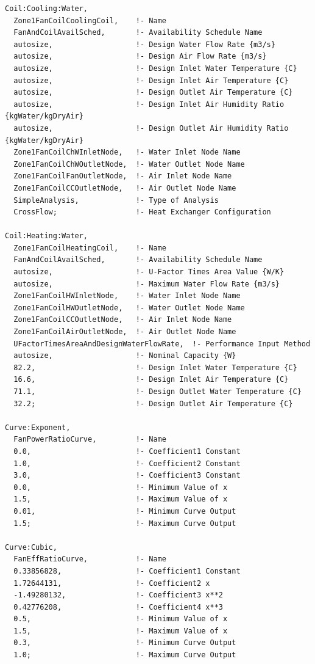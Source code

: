 \begin{lstlisting}
Coil:Cooling:Water,
  Zone1FanCoilCoolingCoil,    !- Name
  FanAndCoilAvailSched,       !- Availability Schedule Name
  autosize,                   !- Design Water Flow Rate {m3/s}
  autosize,                   !- Design Air Flow Rate {m3/s}
  autosize,                   !- Design Inlet Water Temperature {C}
  autosize,                   !- Design Inlet Air Temperature {C}
  autosize,                   !- Design Outlet Air Temperature {C}
  autosize,                   !- Design Inlet Air Humidity Ratio {kgWater/kgDryAir}
  autosize,                   !- Design Outlet Air Humidity Ratio {kgWater/kgDryAir}
  Zone1FanCoilChWInletNode,   !- Water Inlet Node Name
  Zone1FanCoilChWOutletNode,  !- Water Outlet Node Name
  Zone1FanCoilFanOutletNode,  !- Air Inlet Node Name
  Zone1FanCoilCCOutletNode,   !- Air Outlet Node Name
  SimpleAnalysis,             !- Type of Analysis
  CrossFlow;                  !- Heat Exchanger Configuration

Coil:Heating:Water,
  Zone1FanCoilHeatingCoil,    !- Name
  FanAndCoilAvailSched,       !- Availability Schedule Name
  autosize,                   !- U-Factor Times Area Value {W/K}
  autosize,                   !- Maximum Water Flow Rate {m3/s}
  Zone1FanCoilHWInletNode,    !- Water Inlet Node Name
  Zone1FanCoilHWOutletNode,   !- Water Outlet Node Name
  Zone1FanCoilCCOutletNode,   !- Air Inlet Node Name
  Zone1FanCoilAirOutletNode,  !- Air Outlet Node Name
  UFactorTimesAreaAndDesignWaterFlowRate,  !- Performance Input Method
  autosize,                   !- Nominal Capacity {W}
  82.2,                       !- Design Inlet Water Temperature {C}
  16.6,                       !- Design Inlet Air Temperature {C}
  71.1,                       !- Design Outlet Water Temperature {C}
  32.2;                       !- Design Outlet Air Temperature {C}

Curve:Exponent,
  FanPowerRatioCurve,         !- Name
  0.0,                        !- Coefficient1 Constant
  1.0,                        !- Coefficient2 Constant
  3.0,                        !- Coefficient3 Constant
  0.0,                        !- Minimum Value of x
  1.5,                        !- Maximum Value of x
  0.01,                       !- Minimum Curve Output
  1.5;                        !- Maximum Curve Output

Curve:Cubic,
  FanEffRatioCurve,           !- Name
  0.33856828,                 !- Coefficient1 Constant
  1.72644131,                 !- Coefficient2 x
  -1.49280132,                !- Coefficient3 x**2
  0.42776208,                 !- Coefficient4 x**3
  0.5,                        !- Minimum Value of x
  1.5,                        !- Maximum Value of x
  0.3,                        !- Minimum Curve Output
  1.0;                        !- Maximum Curve Output
\end{lstlisting}

